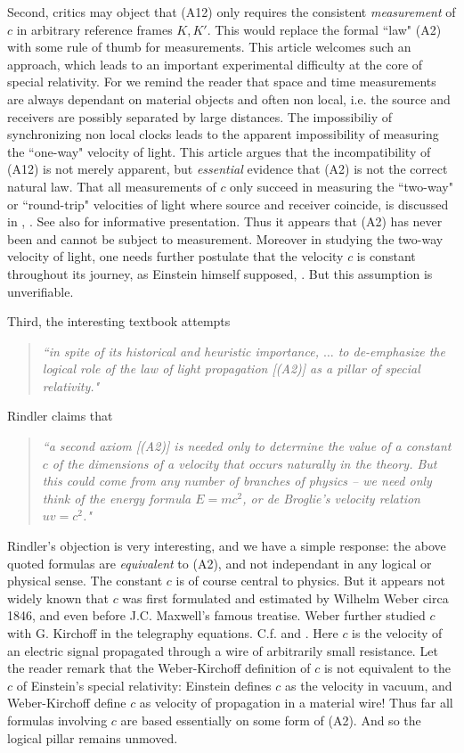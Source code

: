 \documentclass[12pt]{amsart}
\theoremstyle{definition}
\theoremstyle{remark}
\begin{document}
Second, critics may object that (A12) only requires the consistent \emph{measurement} of $c$ in arbitrary reference frames $K, K'$. This would replace the formal ``law" (A2) with some rule of thumb for measurements. This article welcomes such an approach, which leads to an important experimental difficulty at the core of special relativity. For we remind the reader that space and time measurements are always dependant on material objects and often non local, i.e. the source and receivers are possibly separated by large distances. The impossibiliy of synchronizing non local clocks leads to the apparent impossibility of measuring the ``one-way" velocity of light. This article argues that the incompatibility of (A12) is not merely apparent, but \emph{essential} evidence that (A2) is not the correct natural law. That all measurements of $c$ only succeed in measuring the ``two-way" or ``round-trip" velocities of light where source and receiver coincide, is discussed in \cite{zhang1997special}, \cite{israel}. See also \cite{vid} for informative presentation. Thus it appears that (A2) has never been and cannot be subject to measurement. Moreover in studying the two-way velocity of light, one needs further postulate that the velocity $c$ is constant throughout its journey, as Einstein himself supposed, \cite[Ch.8]{einstein2019relativity}. But this assumption is unverifiable.

Third, the interesting textbook \cite[pp.8-10, 21-22]{rindler} attempts 
\begin{quote}
\emph{``in spite of its historical and heuristic importance, $\ldots$ to de-emphasize the logical role of the law of light propagation [(A2)] as a pillar of special relativity."}
\end{quote}
Rindler claims that
\begin{quote}
\emph{``a second axiom [(A2)] is needed \emph{only} to determine the value of a constant $c$ of the dimensions of a velocity that occurs naturally in the theory. But this could come from any number of branches of physics -- we need only think of the energy formula $E=mc^2$, or de Broglie's velocity relation $u v =c^2$." }
\end{quote}
Rindler's objection is very interesting, and we have a simple response: the above quoted formulas are \emph{equivalent} to (A2), and not independant in any logical or physical sense. The constant $c$ is of course central to physics. But it appears not widely known that $c$ was first formulated and estimated by Wilhelm Weber circa 1846, and even before J.C. Maxwell's famous treatise. Weber further studied $c$ with G. Kirchoff in the telegraphy equations. C.f. \cite{assis1999meaning} and \cite{awk}. Here $c$ is the velocity of an electric signal propagated through a wire of arbitrarily small resistance. Let the reader remark that the Weber-Kirchoff definition of $c$ is not equivalent to the $c$ of Einstein's special relativity:
Einstein defines $c$ as the velocity in vacuum, and Weber-Kirchoff define $c$ as velocity of propagation in a material wire! Thus far all formulas involving $c$ are based essentially on some form of (A2). And so the logical pillar remains unmoved. 
\end{document}
